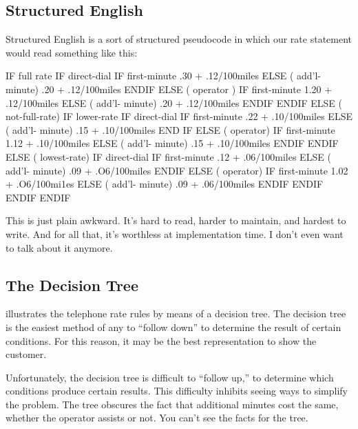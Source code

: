\subsection{Structured English}

Structured English is a sort of structured pseudocode in which our rate
statement would read something like this:

\begin{Code}
IF full rate
   IF direct-dial
      IF first-minute
	 .30 + .12/100miles
      ELSE ( add'l- minute)
	 .20 + .12/100miles
      ENDIF
   ELSE ( operator )
      IF first-minute
	 1.20 + .12/100miles
      ELSE ( add'l- minute)
	 .20 + .12/100miles
      ENDIF
   ENDIF
ELSE  ( not-full-rate)
   IF lower-rate
      IF direct-dial
	 IF first-minute
	    .22 + .10/100miles
	 ELSE ( add'l- minute)
	    .15 + .10/100miles
	 END IF
      ELSE ( operator)
	 IF first-minute
	    1.12 + .10/100miles
	 ELSE ( add'l- minute)
	    .15 + .10/100miles
	 ENDIF
      ENDIF
   ELSE ( lowest-rate)
      IF direct-dial
	 IF first-minute
	    .12 + .06/100miles
	 ELSE ( add'l- minute)
	    .09 + .O6/100miles
	 ENDIF
      ELSE ( operator)
	 IF first-minute
	    1.02 + .O6/100mi1es
	 ELSE ( add'l- minute)
	    .09 + .06/100miles
	 ENDIF
      ENDIF
   ENDIF
ENDIF
\end{Code}
This is just plain awkward. It's hard to read, harder to maintain, and
hardest to write. And for all that, it's worthless at implementation
time. I don't even want to talk about it anymore.

\subsection{The Decision Tree}

 illustrates the telephone rate rules by means of a
decision tree.  The decision tree is the easiest method of any to
``follow down'' to determine the result of certain conditions. For
this reason, it may be the best representation to show the customer.


Unfortunately, the decision tree is difficult to ``follow up,'' to
determine which conditions produce certain results. This difficulty
inhibits seeing ways to simplify the problem. The tree obscures the
fact that additional minutes cost the same, whether the operator
assists or not. You can't see the facts for the tree.


